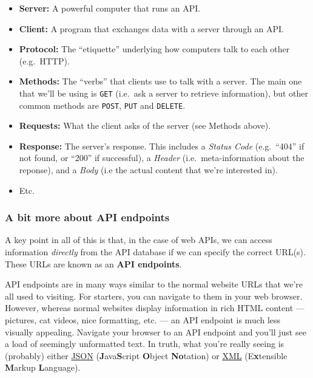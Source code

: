 \documentclass[
]{article}
\providecommand{\tightlist}{%
  \setlength{\itemsep}{0pt}\setlength{\parskip}{0pt}}
\begin{document}
\begin{itemize}
\tightlist
\item
  \textbf{Server:} A powerful computer that runs an API.
\item
  \textbf{Client:} A program that exchanges data with a server through
  an API.
\item
  \textbf{Protocol:} The ``etiquette'' underlying how computers talk to
  each other (e.g.~HTTP).
\item
  \textbf{Methods:} The ``verbs'' that clients use to talk with a
  server. The main one that we'll be using is \texttt{GET} (i.e.~ask a
  server to retrieve information), but other common methods are
  \texttt{POST}, \texttt{PUT} and \texttt{DELETE}.
\item
  \textbf{Requests:} What the client asks of the server (see Methods
  above).
\item
  \textbf{Response:} The server's response. This includes a \emph{Status
  Code} (e.g.~``404'' if not found, or ``200'' if successful), a
  \emph{Header} (i.e.~meta-information about the reponse), and a
  \emph{Body} (i.e the actual content that we're interested in).
\item
  Etc.
\end{itemize}

\hypertarget{a-bit-more-about-api-endpoints}{%
\subsubsection{A bit more about API
endpoints}\label{a-bit-more-about-api-endpoints}}

A key point in all of this is that, in the case of web APIs, we can
access information \emph{directly} from the API database if we can
specify the correct URL(s). These URLs are known as an \textbf{API
endpoints}.

API endpoints are in many ways similar to the normal website URLs that
we're all used to visiting. For starters, you can navigate to them in
your web browser. However, whereas normal websites display information
in rich HTML content --- pictures, cat videos, nice formatting, etc. ---
an API endpoint is much less visually appealing. Navigate your browser
to an API endpoint and you'll just see a load of seemingly unformatted
text. In truth, what you're really seeing is (probably) either
\href{https://en.wikipedia.org/wiki/JSON}{JSON}
(\textbf{J}ava\textbf{S}cript \textbf{O}bject \textbf{No}tation) or
\href{https://en.wikipedia.org/wiki/XML}{XML} (E\textbf{x}tensible
\textbf{M}arkup \textbf{L}anguage).
\end{document}

